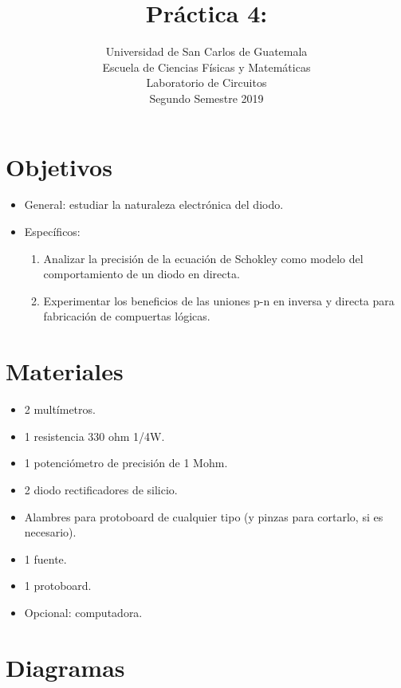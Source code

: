\documentclass[letterpaper, 12 pt, conference]{ieeeconf}  %
\title{\LARGE \bf
Práctica 4: 
}
\author{Universidad de San Carlos de Guatemala \\%
Escuela de Ciencias Físicas y Matemáticas\\
Laboratorio de Circuitos\\
Segundo Semestre 2019
}
\begin{document}
\maketitle
\thispagestyle{empty}
\pagestyle{empty}

\section{Objetivos}
\begin{itemize}
    \item General: estudiar la naturaleza electrónica del diodo.
    \item Específicos:
    \begin{enumerate}
    \item Analizar la precisión de la ecuación de Schokley como modelo del comportamiento de un diodo en directa.
    \item Experimentar los beneficios de las uniones p-n en inversa y directa para fabricación de compuertas lógicas.
\end{enumerate}
\end{itemize}


\section{Materiales}
\begin{itemize}
    \item 2 multímetros.
    \item 1 resistencia 330 ohm 1/4W.
    \item 1 potenciómetro de precisión de 1 Mohm.
    \item 2 diodo rectificadores de silicio.
    \item Alambres para protoboard de cualquier tipo (y pinzas para cortarlo, si es necesario).
    \item 1 fuente.
    \item 1 protoboard.
    \item Opcional: computadora.
\end{itemize}
\pagebreak

\section{Diagramas}
\end{document}
